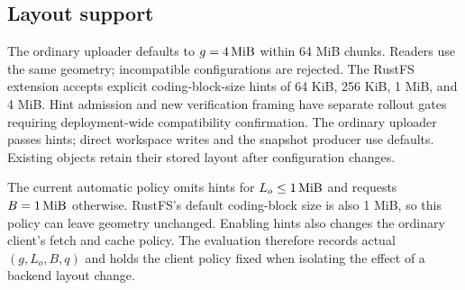 \subsection{Layout support}

The ordinary uploader defaults to $g=4\,\mathrm{MiB}$ within 64 MiB chunks.
Readers use the same geometry; incompatible configurations are rejected.
The RustFS extension accepts explicit coding-block-size hints of
64 KiB, 256 KiB, 1 MiB, and 4 MiB. Hint admission and new verification
framing have separate rollout gates requiring deployment-wide
compatibility confirmation. The ordinary uploader passes hints;
direct workspace writes and the snapshot producer use defaults.
Existing objects retain their stored layout after configuration changes.

The current automatic policy omits hints for $L_o\leq1\,\mathrm{MiB}$ and
requests $B=1\,\mathrm{MiB}$ otherwise. RustFS's default coding-block size is also
1 MiB, so this policy can leave geometry unchanged. Enabling hints also
changes the ordinary client's fetch and cache policy. The evaluation
therefore records actual $(g,L_o,B,q)$ and holds the client policy fixed
when isolating the effect of a backend layout change.
